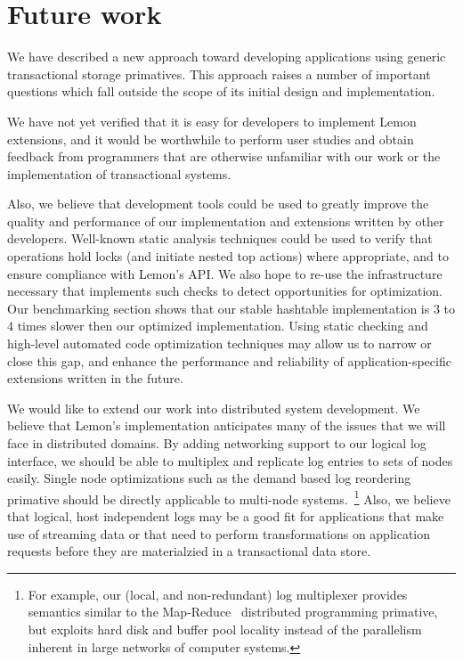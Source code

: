 \documentclass[letterpaper,twocolumn,english]{article}
\newcommand{\yad}{Lemon\xspace}
\begin{document}
\section{Future work}

We have described a new approach toward developing applications using
generic transactional storage primatives.  This approach raises a
number of important questions which fall outside the scope of its
initial design and implementation.

We have not yet verified that it is easy for developers to implement
\yad extensions, and it would be worthwhile to perform user studies
and obtain feedback from programmers that are otherwise unfamiliar
with our work or the implementation of transactional systems.

Also, we believe that development tools could be used to greatly
improve the quality and performance of our implementation and
extensions written by other developers.  Well-known static analysis
techniques could be used to verify that operations hold locks (and
initiate nested top actions) where appropriate, and to ensure
compliance with \yad's API.  We also hope to re-use the infrastructure
necessary that implements such checks to detect opportunities for
optimization.  Our benchmarking section shows that our stable
hashtable implementation is 3 to 4 times slower then our optimized
implementation.  Using static checking and high-level automated code
optimization techniques may allow us to narrow or close this
gap, and enhance the performance and reliability of application-specific 
extensions written in the future.

We would like to extend our work into distributed system
development.  We believe that \yad's implementation anticipates many
of the issues that we will face in distributed domains.  By adding 
networking support to our logical log interface,
we should be able to multiplex and replicate log entries to sets of
nodes easily.  Single node optimizations such as the demand based log
reordering primative should be directly applicable to multi-node
systems.~\footnote{For example, our (local, and non-redundant) log
multiplexer provides semantics similar to the
Map-Reduce~\cite{mapReduce} distributed programming primative, but
exploits hard disk and buffer pool locality instead of the parallelism
inherent in large networks of computer systems.}  Also, we believe
that logical, host independent logs may be a good fit for applications
that make use of streaming data or that need to perform
transformations on application requests before they are materialzied
in a transactional data store.
\end{document}
